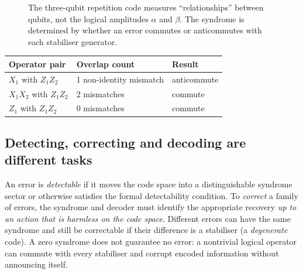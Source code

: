 \begin{figure}[t]
\centering
{}
\caption{The three-qubit repetition code measures ``relationships'' between qubits, not the logical amplitudes $\alpha$ and $\beta$. The syndrome is determined by whether an error commutes or anticommutes with each stabiliser generator.}
\label{fig:qec_repetition}
\end{figure}

\begin{center}
\small
\begin{tabular}{@{}lll@{}}\toprule
Operator pair&Overlap count&Result\\\midrule
$X_1$ with $Z_1Z_2$&1 non-identity mismatch&anticommute\\
$X_1X_2$ with $Z_1Z_2$&2 mismatches&commute\\
$Z_1$ with $Z_1Z_2$&0 mismatches&commute\\\bottomrule
\end{tabular}
\end{center}

\subsection{Detecting, correcting and decoding are different tasks}
An error is \emph{detectable} if it moves the code space into a distinguishable syndrome sector or otherwise satisfies the formal detectability condition. To \emph{correct} a family of errors, the syndrome and decoder must identify the appropriate recovery \emph{up to an action that is harmless on the code space}. Different errors can have the same syndrome and still be correctable if their difference is a stabiliser (a \emph{degenerate} code). A zero syndrome does not guarantee no error: a nontrivial logical operator can commute with every stabiliser and corrupt encoded information without announcing itself.

